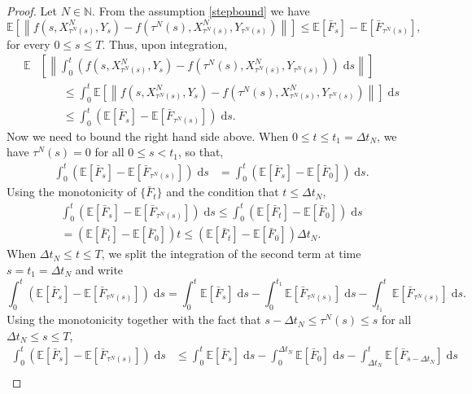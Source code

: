 \documentclass[reqno,12pt]{amsart}
\theoremstyle{plain} %
\theoremstyle{definition} %
\begin{document}
\begin{proof}
    Let $N\in \mathbb{N}$. From the assumption \eqref{stepbound} we have
    \[
        \mathbb{E}\left[\left\|f(s, X_{\tau^N(s)}^N, Y_s) - f(\tau^N(s), X_{\tau^N(s)}^N, Y_{\tau^N(s)})\right\|\right] \leq \mathbb{E}[\bar F_s] - \mathbb{E}[\bar F_{\tau^N(s)}],
    \]
    for every $0\leq s \leq T$. Thus, upon integration,
    \begin{align*}
        \mathbb{E}&\left[\left\|\int_0^t \left( f(s, X_{\tau^N(s)}^N, Y_s) - f(\tau^N(s), X_{\tau^N(s)}^N, Y_{\tau^N(s)}) \right)\;\mathrm{d}s\right\|\right] \\
        & \qquad \leq \int_0^t \mathbb{E}\left[\left\|f(s, X_{\tau^N(s)}^N, Y_s) - f(\tau^N(s), X_{\tau^N(s)}^N, Y_{\tau^N(s)})\right\| \right]\;\mathrm{d}s \\
        & \qquad \leq \int_0^t \left(\mathbb{E}[\bar F_s] - \mathbb{E}[\bar F_{\tau^N(s)}]\right)\;\mathrm{d}s.
    \end{align*}
    Now we need to bound the right hand side above. When $0 \leq t\leq t_1 = \Delta t_N$, we have $\tau^N(s) = 0$ for all $0 \leq s < t_1$, so that,
    \begin{align*}
      \int_0^t (\mathbb{E}[\bar F_s] - \mathbb{E}[\bar F_{\tau^N(s)}])\;\mathrm{d}s & = \int_0^t (\mathbb{E}[\bar F_s] - \mathbb{E}[\bar F_{0}]) \;\mathrm{d}s.
    \end{align*}
    Using the monotonicity of $\{\bar F_t\}$ and the condition that $t \leq \Delta t_N$,
    \begin{multline*}
      \int_0^t (\mathbb{E}[\bar F_s] - \mathbb{E}[\bar F_{\tau^N(s)}])\;\mathrm{d}s \leq \int_0^t (\mathbb{E}[\bar F_t] - \mathbb{E}[\bar F_0]) \;\mathrm{d}s  \\
      = (\mathbb{E}[\bar F_t] - \mathbb{E}[\bar F_0])t \leq (\mathbb{E}[\bar F_t] - \mathbb{E}[\bar F_0])\Delta t_N.
    \end{multline*}
    When $\Delta t_N\leq t \leq T$, we split the integration of the second term at time $s = t_1 = \Delta t_N$ and write
    \[ 
      \int_0^t (\mathbb{E}[\bar F_s] - \mathbb{E}[\bar F_{\tau^N(s)}])\;\mathrm{d}s = \int_0^t \mathbb{E}[\bar F_s] \;\mathrm{d}s - \int_0^{t_1} \mathbb{E}[\bar F_{\tau^N(s)}]\;\mathrm{d}s - \int_{t_1}^t \mathbb{E}[\bar F_{\tau^N(s)}]\;\mathrm{d}s.
    \]
    Using the monotonicity together with the fact that $s - \Delta t_N\leq \tau^N(s) \leq s$ for all $\Delta t_N\leq s \leq T$,
    \begin{align*}
        \int_0^t (\mathbb{E}[\bar F_s] - \mathbb{E}[\bar F_{\tau^N(s)}])\;\mathrm{d}s & \leq \int_0^t \mathbb{E}[\bar F_s] \;\mathrm{d}s - \int_0^{\Delta t_N} \mathbb{E}[\bar F_0]\;\mathrm{d}s - \int_{\Delta t_N}^t \mathbb{E}[\bar F_{s-\Delta t_N}]\;\mathrm{d}s \\

\end{align*}
\end{proof}
\end{document}
